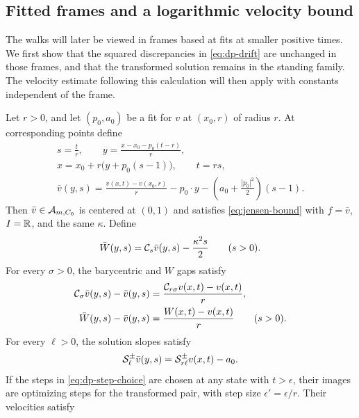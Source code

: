 \subsection{Fitted frames and a logarithmic velocity bound}

The walks will later be viewed in frames based at fits at smaller positive
times.  We first show that the squared discrepancies in
\eqref{eq:dp-drift} are unchanged in those frames, and that the transformed
solution remains in the standing family.  The velocity estimate following
this calculation will then apply with constants independent of the frame.

\begin{lemma}\label{lem:fitted-frame-covariance}
Let $r>0$, and let $(p_0,a_0)$ be a fit for $v$ at $(x_0,r)$ of radius $r$.
At corresponding points define
\begin{equation}\label{eq:contact-frame}
\begin{gathered}
  s=\frac{t}{r},\qquad y=\frac{x-x_0-p_0(t-r)}{r},\\
  x=x_0+r\bigl(y+p_0(s-1)\bigr),\qquad t=rs,\\
  \bar v(y,s)=\frac{v(x,t)-v(x_0,r)}{r}
          -p_0\cdot y-\left(a_0+\frac{|p_0|^2}{2}\right)(s-1).
\end{gathered}
\end{equation}
Then $\bar v\in\mathcal{A}_{m,C_0}$ is centered at $(0,1)$ and satisfies
\eqref{eq:jensen-bound} with $f=\bar v$, $I=\mathbb{R}$, and the same $\kappa$.  Define
\[
  \bar W(y,s)=\mathcal{C}_s\bar v(y,s)-\frac{\kappa^2s}{2}\qquad(s>0).
\]
For every $\sigma>0$, the barycentric and $W$ gaps satisfy
\begin{equation}\label{eq:contact-W-covariance}
\begin{split}
  \mathcal{C}_\sigma\bar v(y,s)-\bar v(y,s)
       &=\frac{\mathcal{C}_{r\sigma}v(x,t)-v(x,t)}{r},\\
  \bar W(y,s)-\bar v(y,s)&=\frac{W(x,t)-v(x,t)}{r}
       \qquad(s>0).
\end{split}
\end{equation}
For every $\ell>0$, the solution slopes satisfy
\begin{equation}\label{eq:fitted-slope-covariance}
  \mathcal{S}_\ell^\pm\bar v(y,s)=\mathcal{S}_{r\ell}^\pm v(x,t)-a_0.
\end{equation}
If the steps in \eqref{eq:dp-step-choice} are chosen at any state with
$t>\epsilon$, their images are optimizing steps for the transformed pair,
with step size $\epsilon'=\epsilon/r$.  Their velocities satisfy

\end{lemma}
